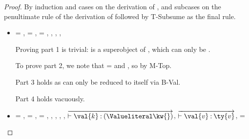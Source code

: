 \begin{lemma} \label{appendix:lemma:soundness}
{\soundnesslemmahypothesis}
\begin{proof}
By induction and cases on the derivation of \opsem {\openv{}} {\e{}} {\a{}},
and subcases on the penultimate rule of the derivation of
\judgementrewrite{\propenv{}}{\ep{}}{\ty{}}{\filterset{\thenprop{\prop{}}}{\elseprop{\prop{}}}}{\object{}}{\e{}}
followed by T-Subsume as the final rule.


\begin{case}[B-Val]

  \begin{itemize}
    \item[] 
      \begin{subcase}[T-True]
        \val{} = \true{},
  \ep{} = \true{},
  \e{} = \true{}, \issubtypein{}{\True}{\ty{}}, \inpropenv{\topprop{}}{\thenprop{\prop{}}}, 
  \inpropenv{\botprop{}}{\elseprop{\prop{}}}, \issubtypein{}{\emptyobject{}}{\object{}}

        Proving part 1 is trivial: \object{} is a superobject of \emptyobject{}, which can only be \emptyobject{}.

        To prove part 2, we note that \val{} = \true{}
        and \inpropenv{\topprop{}}{\thenprop{\prop{}}},
        so \satisfies{\openv{}}{\thenprop{\prop{}}} by M-Top.

        Part 3 holds as \e{} can only be reduced to itself via B-Val.

        Part 4 holds vacuously.
      \end{subcase}
    \item[]
      \begin{subcase}[T-HMap] \val{} = {},
  \ep{} = {},
  \e{} = {},
  \issubtypein{}{\HMapc {\mandatory{}}}{\ty{}},
  \inpropenv{\topprop{}}{\thenprop{\prop{}}},
  \inpropenv{\botprop{}}{\elseprop{\prop{}}},
  \issubtypein{}{\emptyobject{}}{\object{}},
  $\overrightarrow{\judgementtwo {} {\val{k}}{\Value \kw{}}}$,
  $\overrightarrow{\judgementtwo {} {\val{v}}{\ty{v}}}$,
  \mandatory{} = 


\end{subcase}
\end{itemize}
\end{case}
\end{proof}
\end{lemma}

